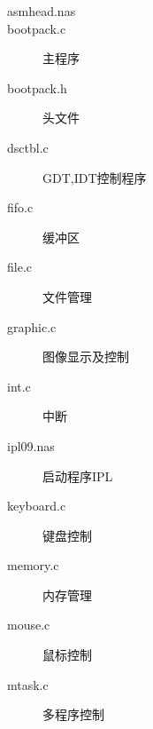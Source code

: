 \begin{description}
    \item[asmhead.nas]                                                                                                                                        
    \item[bootpack.c] 主程序                                                                                                                                      
    \item[bootpack.h] 头文件                                                                                                                                           
    \item[dsctbl.c] GDT,IDT控制程序                                                                                                                                          
    \item[fifo.c] 缓冲区                                                                                                                           
    \item[file.c] 文件管理                                                                                                                                            
    \item[graphic.c] 图像显示及控制                                                                                                                                     
    \item[int.c] 中断                                                                                                                                             
    \item[ipl09.nas] 启动程序IPL                                                                                                                                         
    \item[keyboard.c] 键盘控制                                                                                                                                       
    \item[memory.c] 内存管理                                                                                                                                          
    \item[mouse.c] 鼠标控制                                                                                                                                           
    \item[mtask.c] 多程序控制                                                                                                                                           

\end{description}

